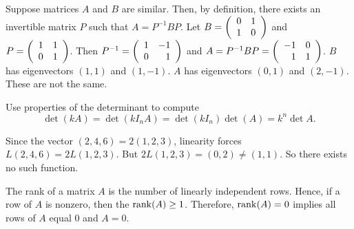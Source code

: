 \documentclass{ximera}
\begin{document}
\begin{exercise}
\begin{solution}
\begin{enumeratea}
\item Suppose matrices $A$ and $B$ are similar. Then, by definition, there exists an invertible matrix $P$ such that $A=P^{-1}BP$. Let $B=\left(\begin{array}{rrrrrrrrrrrrrrrrrr}  0 & 1 \\ 1 & 0 \end{array}\right)$ and $P=\left(\begin{array}{rrrrrrrrrrrrrrrrrr}  1 & 1 \\ 0 & 1 \end{array}\right)$. Then $P^{-1}=\left(\begin{array}{rrrrrrrrrrrrrrrrrr}  1 & -1 \\ 0 & 1 \end{array}\right)$ and $A=P^{-1}BP=\left(\begin{array}{rrrrrrrrrrrrrrrrrr}  -1 & 0 \\ 1 & 1 \end{array}\right)$. $B$ has eigenvectors $(1,1)$ and $(1,-1)$. $A$ has eigenvectors $(0,1)$ and $(2,-1)$. These are not the same. 

\item Use properties of the determinant to compute
\[
\det(kA) = \det (kI_n A) = \det (kI_n)\det (A)=k^n \det A.
\]

\item Since the vector $(2,4,6)=2(1,2,3)$, linearity forces $L(2,4,6)=2L(1,2,3)$. But $2L(1,2,3)=(0,2)\ne (1,1)$. So there exists no such function.

\item The rank of a matrix $A$ is the number of linearly independent rows. Hence, if a row of $A$ is nonzero, then the ${\rm rank}(A)\geq 1$.  Therefore, ${\rm rank}(A) = 0$ implies all rows of $A$ equal $0$ and $A=0$.
\end{enumeratea}



  
\end{solution}
\end{exercise}
\end{document}
